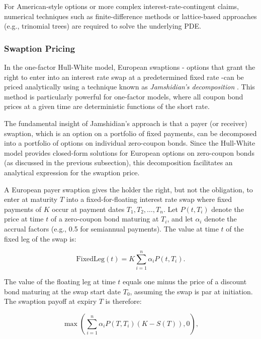 For American-style options or more complex interest-rate-contingent claims, numerical techniques such as finite-difference methods or lattice-based approaches (e.g., trinomial trees) are required to solve the underlying PDE.

\subsubsection{Swaption Pricing} \label{swaption_pricing}
In the one-factor Hull-White model, European swaptions - options that grant the right to enter into an interest rate swap at a predetermined fixed rate -can be priced analytically using a technique known as \textit{Jamshidian’s decomposition} \parencite{jamshidian1989decomposition}. This method is particularly powerful for one-factor models, where all coupon bond prices at a given time are deterministic functions of the short rate.

The fundamental insight of Jamshidian’s approach is that a payer (or receiver) swaption, which is an option on a portfolio of fixed payments, can be decomposed into a portfolio of options on individual zero-coupon bonds. Since the Hull-White model provides closed-form solutions for European options on zero-coupon bonds (as discussed in the previous subsection), this decomposition facilitates an analytical expression for the swaption price.

A European payer swaption gives the holder the right, but not the obligation, to enter at maturity \( T \) into a fixed-for-floating interest rate swap where fixed payments of \( K \) occur at payment dates \( T_1, T_2, \dots, T_n \). Let \( P(t, T_i) \) denote the price at time \( t \) of a zero-coupon bond maturing at \( T_i \), and let \( \alpha_i \) denote the accrual factors (e.g., 0.5 for semiannual payments). The value at time \( t \) of the fixed leg of the swap is:

\begin{equation}
	\text{FixedLeg}(t) = K \sum_{i=1}^n \alpha_i P(t, T_i).
\end{equation}

The value of the floating leg at time \( t \) equals one minus the price of a discount bond maturing at the swap start date \( T_0 \), assuming the swap is par at initiation. The swaption payoff at expiry \( T \) is therefore:

\begin{equation}
	\max\left( \sum_{i=1}^n \alpha_i P(T, T_i) (K - S(T)), 0 \right),
\end{equation}

